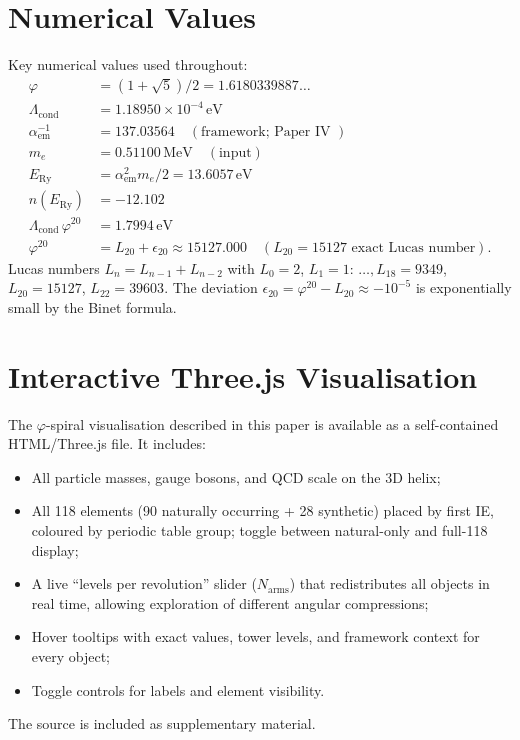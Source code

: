 \documentclass[11pt,a4paper]{article}
\theoremstyle{definition}
\theoremstyle{remark}
\newcommand{\vp}{\varphi}
\newcommand{\Lcond}{\Lambda_{\mathrm{cond}}}
\newcommand{\ERy}{E_{\mathrm{Ry}}}
\newcommand{\aem}{\alpha_{\mathrm{em}}}
\begin{document}
\appendix

\section{Numerical Values}
\label{P11:app:numerics}

Key numerical values used throughout:
\begin{align}
  \vp &= (1+\sqrt{5})/2 = 1.6180339887\ldots \\
  \Lcond &= 1.18950\times10^{-4}\,\mathrm{eV} \\
  \aem^{-1} &= 137.03564 \quad (\text{framework; Paper~IV~}) \\
  m_e &= 0.51100\,\mathrm{MeV} \quad (\text{input}) \\
  \ERy &= \aem^2 m_e/2 = 13.6057\,\mathrm{eV} \\
  n(\ERy) &= -12.102 \\
  \Lcond\,\vp^{20} &= 1.7994\,\mathrm{eV} \\
  \vp^{20} &= L_{20} + \epsilon_{20} \approx 15127.000
    \quad (L_{20} = 15127 \text{ exact Lucas number}).
\end{align}
Lucas numbers $L_n = L_{n-1}+L_{n-2}$ with $L_0=2$, $L_1=1$:
$\ldots, L_{18}=9349$, $L_{20}=15127$, $L_{22}=39603$.
The deviation $\epsilon_{20} = \vp^{20} - L_{20} \approx -10^{-5}$
is exponentially small by the Binet formula.

\section{Interactive Three.js Visualisation}
\label{P11:app:code}

The $\vp$-spiral visualisation described in this paper is available
as a self-contained HTML/Three.js file.
It includes:
\begin{itemize}[noitemsep]
\item All particle masses, gauge bosons, and QCD scale
  on the 3D helix;
\item All 118 elements (90 naturally occurring + 28 synthetic)
  placed by first IE, coloured by periodic table group;
  toggle between natural-only and full-118 display;
\item A live ``levels per revolution'' slider ($N_\mathrm{arms}$)
  that redistributes all objects in real time,
  allowing exploration of different angular compressions;
\item Hover tooltips with exact values, tower levels, and
  framework context for every object;
\item Toggle controls for labels and element visibility.
\end{itemize}
The source is included as supplementary material.
\end{document}
